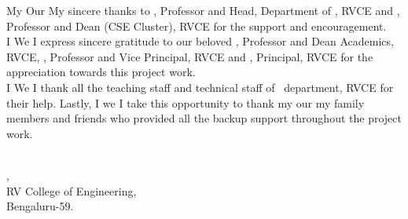 \vspace{-5pt}
\ifPG My \else \ifStuNameBUsed Our \else My \fi\fi sincere thanks to \textbf{\printHOD}, Professor and Head, Department of \ifIDP \printGuideDeptAInLF\else\printDepartmentLF\fi, RVCE and \textbf{\printDeanCS}, Professor and Dean (CSE Cluster), RVCE for the support and encouragement.
\\

\ifPG I \else \ifStuNameBUsed We \else I \fi\fi express sincere gratitude to our beloved \textbf{\printDA}, Professor and Dean Academics, RVCE, \textbf{\printVicePrincipal}, Professor and Vice Principal, RVCE and \textbf{\printPrincipal}, Principal, RVCE for the appreciation towards this project work.\\
\vspace{-5pt}
\ifIDP \else\ifPG I \else\ifStuNameBUsed We \else I \fi\fi thank all the teaching staff and technical staff of \ifIDP \printGuideDeptAInLF\else\printDepartmentLF\fi\, department, RVCE for their help. \fi Lastly, \ifPG I \else\ifStuNameBUsed we \else I \fi\fi take this opportunity to thank \ifPG my \else\ifStuNameBUsed our \else my \fi\fi family members and friends who provided all the backup support throughout the project work.\\

\vspace{-5pt}
\begin{flushright}
\textbf{\printStuNameA}\\ \vspace{-2pt}
\ifIDP \printGuideDeptAInLF\else\printDepartmentLF\fi, \\ \vspace{-2pt}
RV College of Engineering, \\ \vspace{-2pt}
Bengaluru-59.
\end{flushright}